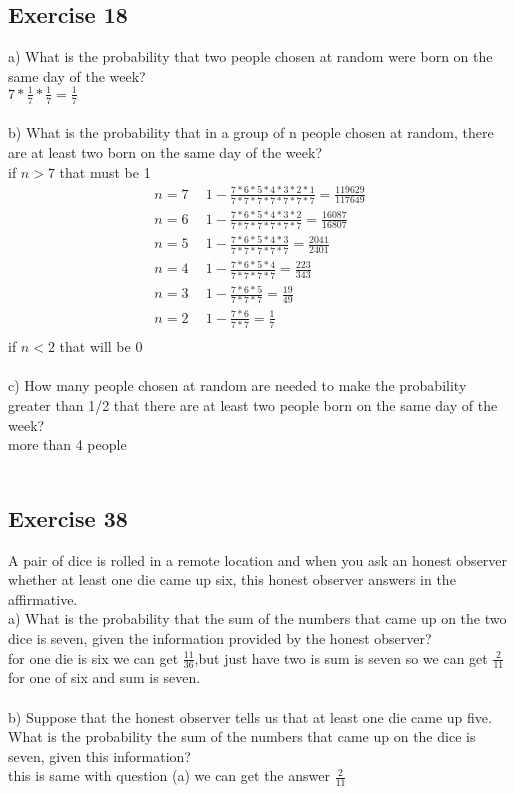 \documentclass[12pt]{article}
\begin{document}
\subsection*{Exercise 18}
a) What is the probability that two people chosen at random were born on the same day of the week?\\
$7*\frac{1}{7}*\frac{1}{7}=\frac{1}{7}$\\
\\
b) What is the probability that in a group of n people chosen at random, there are at least two born on the same day of the week? \\
if $n>7$ that must be 1\\
\begin{equation}\nonumber
    \begin{split}
        n=7&~~1-\frac{7*6*5*4*3*2*1}{7*7*7*7*7*7*7}=\frac{119629}{117649}\\
        n=6&~~1-\frac{7*6*5*4*3*2}{7*7*7*7*7*7}=\frac{16087}{16807}\\
        n=5&~~1-\frac{7*6*5*4*3}{7*7*7*7*7}=\frac{2041}{2401}\\
        n=4&~~1-\frac{7*6*5*4}{7*7*7*7}=\frac{223}{343}\\
        n=3&~~1-\frac{7*6*5}{7*7*7}=\frac{19}{49}\\
        n=2&~~1-\frac{7*6}{7*7}=\frac{1}{7}\\
    \end{split}
\end{equation}
if $n<2$ that will be 0\\
\\
c) How many people chosen at random are needed to make the probability greater than 1/2 that there are at least two people born on the same day of the week?\\
more than 4 people\\
\\
\subsection*{Exercise 38}
A pair of dice is rolled in a remote location and when you ask an honest observer whether at least one die came up six, this honest observer answers in the affirmative.\\
a) What is the probability that the sum of the numbers that came up on the two dice is seven, given the information provided by the honest observer?\\
for one die is six we can get $\frac{11}{36}$,but just have two is sum is seven so we can get $\frac{2}{11}$
for one of six and sum is seven.\\
\\
b) Suppose that the honest observer tells us that at least one die came up five. What is the probability the sum of the numbers that came up on the dice is seven, given this information?\\
this is same with question (a) we can get the answer $\frac{2}{11}$\\
\\
\end{document}
